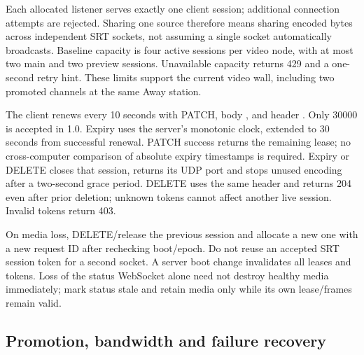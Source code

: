 Each allocated listener serves exactly one client session; additional connection
attempts are rejected. Sharing one source therefore means sharing encoded bytes
across independent SRT sockets, not assuming a single socket automatically
broadcasts. Baseline capacity is four active sessions per video node, with at
most two main and two preview sessions. Unavailable capacity returns 429 and a
one-second retry hint. These limits support the current video wall, including
two promoted channels at the same Away station.

The client renews every 10 seconds with PATCH, body
, and header
. Only 30000 is accepted in 1.0.
Expiry uses the server's monotonic clock, extended to 30 seconds from successful
renewal. PATCH success returns the remaining lease; no cross-computer comparison
of absolute expiry timestamps is required. Expiry or DELETE closes that session,
returns its UDP port and stops unused encoding after a two-second grace period.
DELETE uses the same header and returns 204 even after prior deletion; unknown
tokens cannot affect another live session. Invalid tokens return 403.

On media loss, DELETE/release the previous session and allocate a new one with
a new request ID after rechecking boot/epoch. Do not reuse an accepted SRT session
token for a second socket. A server boot change invalidates all leases and tokens.
Loss of the status WebSocket alone need not destroy healthy media immediately;
mark status stale and retain media only while its own lease/frames remain valid.



\subsection{Promotion, bandwidth and failure recovery}

